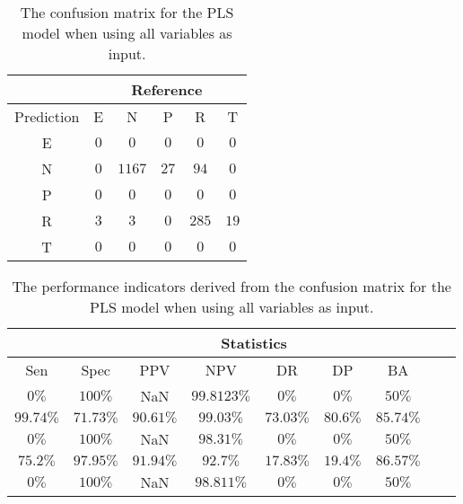 \begin{table}[!ht]
	\centering
	\begin{tabular}{|c|c|c|c|c|c|}
		\hline
		 & \multicolumn{5}{|c|}{Reference} \\ \hline
		 Prediction & E & N & P & R & T \\ \hline
		 E & $0$ & $0$ & $0$ & $0$ & $0$ \\ \hline
		 N & $0$ & $1167$ & $27$ & $94$ & $0$ \\ \hline
		 P & $0$ & $0$ & $0$ & $0$ & $0$ \\ \hline
		 R & $3$ & $3$ & $0$ & $285$ & $19$ \\ \hline
		 T & $0$ & $0$ & $0$ & $0$ & $0$ \\ \hline
	\end{tabular}
	\caption{The confusion matrix for the PLS model when using all variables as input.}
	\label{tab:cm:all:pls}
\end{table}

\begin{table}[!ht]
	\centering
	\begin{tabular}{|c|c|c|c|c|c|c|c|c|}
		\hline
		 & \multicolumn{7}{c|}{Statistics} \\ \hline
		Sen & Spec & PPV & NPV & DR & DP & BA \\ \hline
		$0\%$ & $100\%$ & NaN & $99.8123\%$ & $0\%$ & $0\%$ & $50\%$ \\ \hline
		$99.74\%$ & $71.73\%$ & $90.61\%$ & $99.03\%$ & $73.03\%$ & $80.6\%$ & $85.74\%$ \\ \hline
		$0\%$ & $100\%$ & NaN & $98.31\%$ & $0\%$ & $0\%$ & $50\%$ \\ \hline
		$75.2\%$ & $97.95\%$ & $91.94\%$ & $92.7\%$ & $17.83\%$ & $19.4\%$ & $86.57\%$ \\ \hline
		$0\%$ & $100\%$ & NaN & $98.811\%$ & $0\%$ & $0\%$ & $50\%$ \\ \hline
	\end{tabular}
	\caption{The performance indicators derived from the confusion matrix for the PLS model when using all variables as input.}
	\label{tab:cs:all:pls}
\end{table}

